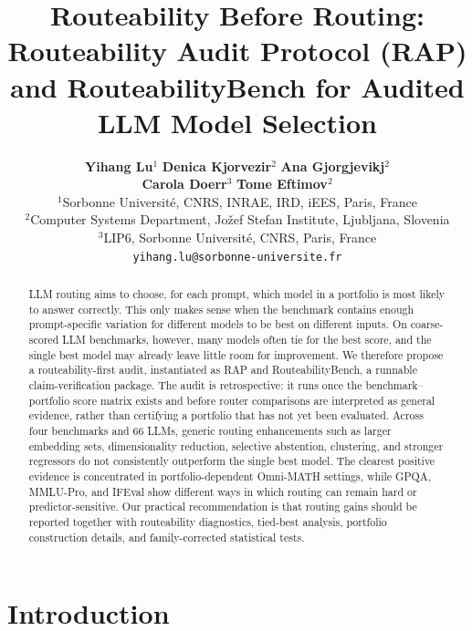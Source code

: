 \documentclass{article}
\title{Routeability Before Routing:\\
Routeability Audit Protocol (RAP) and RouteabilityBench for Audited LLM Model Selection}
\author{%
  \begin{minipage}{0.96\textwidth}
  \centering\normalfont
  {\bfseries Yihang Lu}$^{1}$\qquad
  {\bfseries Denica Kjorvezir}$^{2}$\qquad
  {\bfseries Ana Gjorgjevikj}$^{2}$\\[0.65ex]
  {\bfseries Carola Doerr}$^{3}$\qquad
  {\bfseries Tome Eftimov}$^{2}$\\[1.2ex]
  {\small $^{1}$Sorbonne Universit\'e, CNRS, INRAE, IRD, iEES, Paris, France\\}
  {\small $^{2}$Computer Systems Department, Jo\v{z}ef Stefan Institute, Ljubljana, Slovenia\\}
  {\small $^{3}$LIP6, Sorbonne Universit\'e, CNRS, Paris, France\\}
  \vspace{0.35ex}
  {\small \texttt{yihang.lu@sorbonne-universite.fr}\\}
  \end{minipage}%
}
\begin{document}
\maketitle

\begin{abstract}
LLM routing aims to choose, for each prompt, which model in a portfolio is most likely to answer correctly. This only makes sense when the benchmark contains enough prompt-specific variation for different models to be best on different inputs. On coarse-scored LLM benchmarks, however, many models often tie for the best score, and the single best model may already leave little room for improvement. We therefore propose a routeability-first audit, instantiated as RAP and RouteabilityBench, a runnable claim-verification package. The audit is retrospective: it runs once the benchmark--portfolio score matrix exists and before router comparisons are interpreted as general evidence, rather than certifying a portfolio that has not yet been evaluated. Across four benchmarks and 66 LLMs, generic routing enhancements such as larger embedding sets, dimensionality reduction, selective abstention, clustering, and stronger regressors do not consistently outperform the single best model. The clearest positive evidence is concentrated in portfolio-dependent Omni-MATH settings, while GPQA, MMLU-Pro, and IFEval show different ways in which routing can remain hard or predictor-sensitive. Our practical recommendation is that routing gains should be reported together with routeability diagnostics, tied-best analysis, portfolio construction details, and family-corrected statistical tests.
\end{abstract}

\section{Introduction}
\label{sec:intro}
\end{document}
